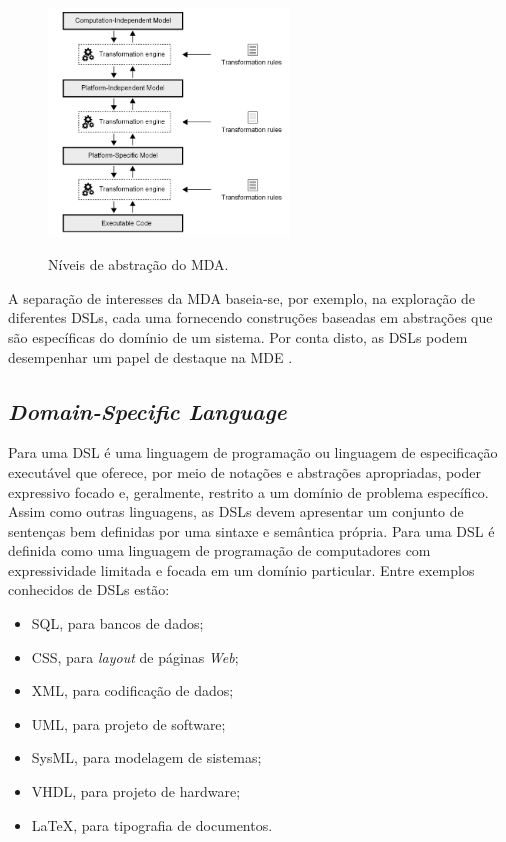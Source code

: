 \begin{figure}[htb]
	\centering
	\caption{Níveis de abstração do MDA.}
		\includegraphics[width=0.57\textwidth]{img/MDA_Process.png}
	\label{fig:MDALevels}
\end{figure}

A separação de interesses da \ac{MDA} baseia-se, por exemplo, na exploração de diferentes \acp{DSL}, cada uma fornecendo construções baseadas em abstrações que são específicas do domínio de um sistema. 
Por conta disto, as \acp{DSL} podem desempenhar um papel de destaque na \ac{MDE} \cite{Schmidt:2006}.


    \subsection{\textit{Domain-Specific Language}} \label{ssec:DSL}
    
Para  uma \ac{DSL} é uma linguagem de programação ou linguagem de especificação executável que oferece, por meio de notações e abstrações apropriadas, poder expressivo focado e, geralmente, restrito a um domínio de problema específico. 
Assim como outras linguagens, as \acp{DSL} devem apresentar um conjunto de sentenças bem definidas por uma sintaxe e semântica própria. 
Para  uma \ac{DSL} é definida como uma linguagem de programação de computadores com expressividade limitada e focada em um domínio particular. 
Entre exemplos conhecidos de \acp{DSL} estão: 

\begin{itemize}
    \item \ac{SQL}, para bancos de dados;
    \item \ac{CSS}, para \textit{layout} de páginas \textit{Web};
    \item \ac{XML}, para codificação de dados;
    \item \ac{UML}, para projeto de software;
    \item \ac{SysML}, para modelagem de sistemas;
    \item \ac{VHDL}, para projeto de hardware;
    \item \LaTeX, para tipografia de documentos.
\end{itemize}
    
